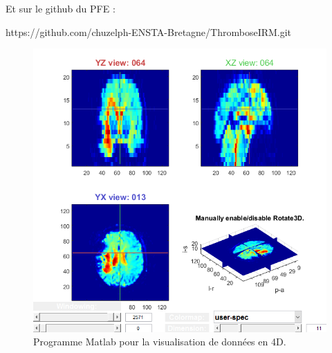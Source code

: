 Et sur le github du PFE :

\medskip

https://github.com/chuzelph-ENSTA-Bretagne/ThromboseIRM.git

\medskip

\begin{figure}[H]
\centering
    \includegraphics[scale=0.8,angle=0]{Images/4D.png}
    \caption{Programme Matlab pour la visualisation de données en 4D.}
    \label{fig:4D}
\end{figure}
